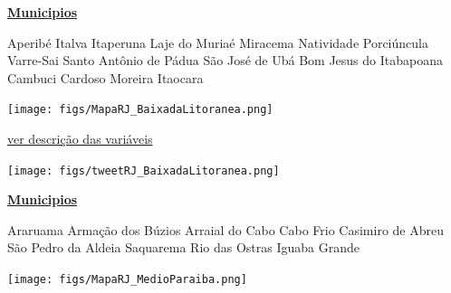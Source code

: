 \documentclass[10pt]{article} %
\begin{document}
\begin{minipage}[t]{.30\linewidth}
\begin{mdframed}[style=sidebar,frametitle={}]
\textbf{\hyperlink{municips}{Municipios}}\begin{itemize}\ysquare Aperibé 
\ysquare Italva 
\ysquare Itaperuna 
\ysquare Laje do Muriaé 
\ysquare Miracema 
\ysquare Natividade 
\ysquare Porciúncula 
\ysquare Varre-Sai 
\ysquare Santo Antônio de Pádua 
\ysquare São José de Ubá 
\ysquare Bom Jesus do Itabapoana 
\ysquare Cambuci 
\ysquare Cardoso Moreira 
\gsquare Itaocara 
\end{itemize}\BackToContents\end{mdframed}\hfill\end{minipage}\newpage\begin{minipage}[t]{.66\linewidth}
\hypertarget{BxdL}{}
\texttt{[image: figs/MapaRJ\_BaixadaLitoranea.png]}\vspace{0.5cm}\begin{center}

\end{center}
\small{\hyperlink{vartab}{ver descrição das variáveis}}\vspace{0.5cm}\begin{center}
\texttt{[image: figs/tweetRJ\_BaixadaLitoranea.png]}\end{center}
\end{minipage}\hfill\begin{minipage}[t]{.30\linewidth}
\begin{mdframed}[style=sidebar,frametitle={}]
\textbf{\hyperlink{municips}{Municipios}}\begin{itemize}\gsquare Araruama 
\gsquare Armação dos Búzios 
\gsquare Arraial do Cabo 
\gsquare Cabo Frio 
\gsquare Casimiro de Abreu 
\gsquare São Pedro da Aldeia 
\gsquare Saquarema 
\gsquare Rio das Ostras 
\gsquare Iguaba Grande 
\end{itemize}\BackToContents\end{mdframed}\hfill\end{minipage}\newpage\begin{minipage}[t]{.66\linewidth}
\hypertarget{MdPr}{}
\texttt{[image: figs/MapaRJ\_MedioParaiba.png]}\vspace{0.5cm}\begin{center}

\end{center}
\end{minipage}
\end{document}
